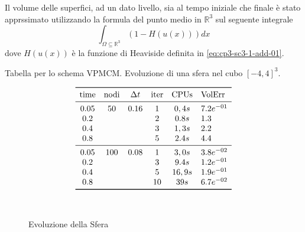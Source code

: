 \begin{osservazione}
Il volume delle superfici, ad un dato livello,  sia al tempo iniziale
che finale è stato apprssimato utilizzando la formula del punto medio
in $\mathbb{R}^3$ sul seguente integrale
\[
\int_{\Omega\subseteq\mathbb{R}^3}(1-H(u(x)))dx
\]
dove $H(u(x))$ è la funzione di Heaviside definita in \eqref{eq:cp3-sc3-1-add-01}.
\end{osservazione}

\begin{table}[htb!]
\caption{Tabella per lo schema VPMCM. Evoluzione di una sfera nel cubo $[-4,4]^3$.}
\label{tab:cp4-sc1-01}
\[
\begin{array}{*{5}{c}l}
    \toprule
    \text{time} &\text{nodi} &\Delta t &\text{iter} &\text{CPUs}&\text{VolErr} \\
    \midrule
     0.05       & 50         & 0.16    & 1          & 0,4s      &7.2e^{-01}\\ 
     0.2        &            &         & 2          & 0.8s      &1.3\\
     0.4        &            &         & 3          & 1,3s      &2.2\\ 
     0.8        &            &         & 5          & 2.4s      &4.4\\
     \midrule
     0.05       & 100        & 0.08    & 1          & 3,0s      &3.8e^{-02}\\ 
     0.2        &            &         & 3          & 9.4s      &1.2e^{-01}\\
     0.4        &            &         & 5          & 16,9s     &1.9e^{-01}\\ 
     0.8        &            &         & 10         & 39s       &6.7e^{-02}\\
    \bottomrule
\end{array}
\]
\end{table}

\begin{figure}[htb!]
  \centering
  \quad
  \\
  \quad
  \quad
  \caption{Evoluzione della Sfera}
  \label{fig:cp4-sc1-01}
\end{figure}

